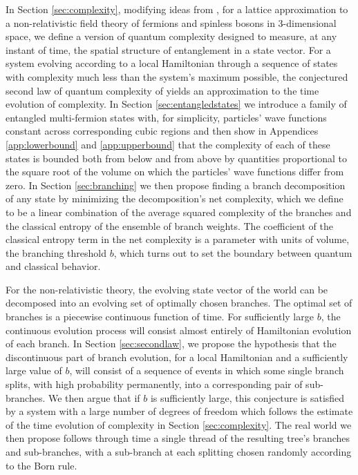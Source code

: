 \documentclass[twocolumn,amsmath,amssymb]{revtex4-1}
\begin{document}
In Section \ref{sec:complexity}, modifying ideas from \cite{Nielsen},
for a lattice approximation to a non-relativistic field theory of fermions and spinless bosons
in 3-dimensional space,
we define a version of quantum complexity
designed to measure, at any instant of time, the spatial structure of entanglement in a state vector.
For a system
evolving according to a local Hamiltonian through a sequence of states with complexity much less than
the system's maximum
possible, the conjectured second law of quantum complexity of \cite{Susskind}
yields an approximation to the
time evolution of complexity.
In Section \ref{sec:entangledstates} we 
introduce a family of entangled
multi-fermion states with, for simplicity, particles' wave functions constant across corresponding
cubic regions and then show in Appendices \ref{app:lowerbound} and \ref{app:upperbound}
that the complexity of each of these states 
is bounded both from below and from above by quantities 
proportional to the square root of the volume on which the particles'
wave functions differ from zero.
In Section \ref{sec:branching} we then propose finding a branch decomposition of any state by 
minimizing the decomposition's net complexity, which we define to be
a linear combination of the average squared complexity of the branches and the
classical entropy of the ensemble of branch weights. 
The coefficient of the classical entropy term in the net complexity is
a parameter with units of volume, the branching threshold $b$, which
turns out to
set the boundary between quantum and classical behavior.

For the non-relativistic theory, the evolving state vector of
the world can be decomposed into an evolving set of
optimally chosen branches.
The optimal set of branches is a piecewise continuous
function of time.
For sufficiently large $b$, the continuous evolution process will consist
almost entirely of Hamiltonian evolution of each branch.
In Section \ref{sec:secondlaw}, we propose the hypothesis that the
discontinuous part of branch evolution, for a
local Hamiltonian and a sufficiently large value of
$b$, 
will consist of
a sequence of events in which some single branch
splits, with high probability permanently, into
a corresponding pair of sub-branches.
We then argue that if $b$ is sufficiently large,
this conjecture is
satisfied by a system with a large number
of degrees of freedom which
follows the estimate of the time evolution of complexity
in Section \ref{sec:complexity}.
The real world we then propose
follows through time a single thread of the resulting
tree's branches and sub-branches,
with a sub-branch at each splitting chosen randomly
according to the Born rule.
\end{document}
